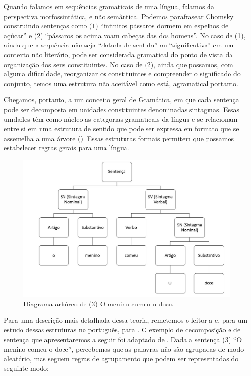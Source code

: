 \documentclass[portuguese]{textolivre}
\begin{document}
Quando falamos em sequências gramaticais de uma língua, falamos da perspectiva morfossintática, e não semântica. Podemos parafrasear Chomsky construindo sentenças como (1) “infinitos pássaros dormem em espelhos de açúcar” e (2) “pássaros os acima voam cabeças das dos homens”. No caso de (1), ainda que a sequência não seja “dotada de sentido” ou “significativa” em um contexto não literário, pode ser considerada gramatical do ponto de vista da organização dos seus constituintes. No caso de (2), ainda que possamos, com alguma dificuldade, reorganizar os constituintes e compreender o significado do conjunto, temos uma estrutura não aceitável como está, agramatical portanto. 

Chegamos, portanto, a um conceito geral de Gramática, em que cada sentença pode ser decomposta em unidades constituintes denominadas sintagmas. Essas unidades têm como núcleo as categorias gramaticais da língua e se relacionam entre si em uma estrutura de sentido que pode ser expressa em formato que se assemelha a uma árvore (). Essas estruturas formais permitem que possamos estabelecer regras gerais para uma língua.

\begin{figure}[htbp]
 \centering
 \includegraphics[width=\textwidth]{Fig1.png}
 \caption{Diagrama arbóreo de (3) O menino comeu o doce.}
 \label{fig1}
\end{figure}

Para uma descrição mais detalhada dessa teoria, remetemos o leitor a \textcite{chomsky_estruturas_2015} e, para um estudo dessas estruturas no português, para \textcite{souza_e_silva_linguistica_2011,othero_gramatica_2009}. O exemplo de decomposição e de sentença que apresentaremos a seguir foi adaptado de \textcite[p. 38-39]{chomsky_estruturas_2015}. Dada a sentença (3) “O menino comeu o doce”, percebemos que as palavras não são agrupadas de modo aleatório, mas seguem regras de agrupamento que podem ser representadas do seguinte modo:
\end{document}
